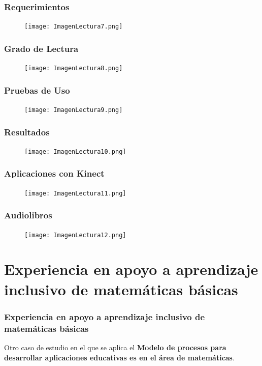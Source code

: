 \documentclass[11pt]{beamer}
\begin{document}
\begin{frame}
\frametitle{Requerimientos}
    \begin{figure}
    \centering
     \texttt{[image: ImagenLectura7.png]}
    \end{figure}
\end{frame}

\begin{frame}
\frametitle{Grado de Lectura}
    \begin{figure}
    \centering
     \texttt{[image: ImagenLectura8.png]}
    \end{figure}
\end{frame}

\begin{frame}
\frametitle{Pruebas de Uso}
    \begin{figure}
    \centering
     \texttt{[image: ImagenLectura9.png]}
    \end{figure}
\end{frame}

\begin{frame}
\frametitle{Resultados}
    \begin{figure}
    \centering
     \texttt{[image: ImagenLectura10.png]}
    \end{figure}
\end{frame}

\begin{frame}
\frametitle{Aplicaciones con Kinect}
    \begin{figure}
    \centering
     \texttt{[image: ImagenLectura11.png]}
    \end{figure}
\end{frame}

\begin{frame}
\frametitle{Audiolibros}
    \begin{figure}
    \centering
     \texttt{[image: ImagenLectura12.png]}
    \end{figure}
\end{frame}

\section{Experiencia en apoyo a aprendizaje inclusivo de matemáticas básicas}
\begin{frame}
\frametitle{Experiencia en apoyo a aprendizaje inclusivo de matemáticas básicas}
\justify
    Otro caso de estudio en el que se aplica el {\bf Modelo de procesos para desarrollar aplicaciones educativas es en el área de matemáticas}.
\end{frame}
\end{document}
